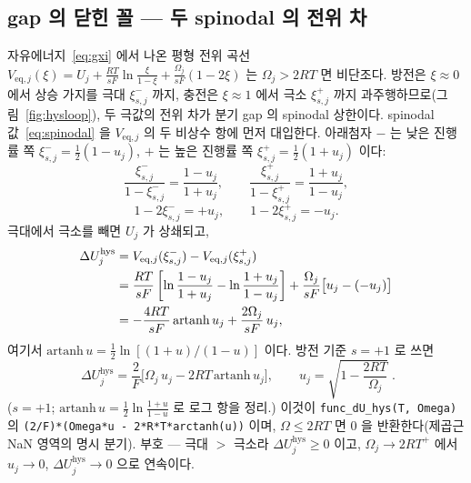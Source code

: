 \documentclass[11pt,a4paper]{article}
\newcommand{\eq}{\mathrm{eq}}
\newcommand{\hys}{\mathrm{hys}}
\newcommand{\code}[1]{\texttt{#1}}
\begin{document}
\subsection{gap 의 닫힌 꼴 — 두 spinodal 의 전위 차}
자유에너지~\eqref{eq:gxi} 에서 나온 평형 전위 곡선
$V_{\eq,j}(\xi)=U_j+\frac{RT}{sF}\ln\frac{\xi}{1-\xi}+\frac{\Omega_j}{sF}(1-2\xi)$ 는 $\Omega_j>2RT$ 면
비단조다. 방전은 $\xi\!\approx\!0$ 에서 상승 가지를 극대 $\xi_{s,j}^-$ 까지, 충전은 $\xi\!\approx\!1$ 에서 극소 $\xi_{s,j}^+$
까지 과주행하므로(그림~\ref{fig:hysloop}), 두 극값의 전위 차가 분기 gap 의 spinodal 상한이다.
spinodal 값~\eqref{eq:spinodal} 을 $V_{\eq,j}$ 의 두 비상수 항에 먼저 대입한다. 아래첨자 $-$ 는 낮은 진행률 쪽
$\xi_{s,j}^-=\tfrac12(1-u_j)$, $+$ 는 높은 진행률 쪽 $\xi_{s,j}^+=\tfrac12(1+u_j)$ 이다:
\begin{equation}
\frac{\xi_{s,j}^-}{1-\xi_{s,j}^-}=\frac{1-u_j}{1+u_j},\qquad
\frac{\xi_{s,j}^+}{1-\xi_{s,j}^+}=\frac{1+u_j}{1-u_j},
\label{eq:hyssub_log}
\end{equation}
\begin{equation}
1-2\xi_{s,j}^-=+u_j,\qquad
1-2\xi_{s,j}^+=-u_j.
\label{eq:hyssub_int}
\end{equation}
극대에서 극소를 빼면 $U_j$ 가 상쇄되고,
\begin{align}
\Delta U_j^\hys
&=V_{\eq,j}(\xi_{s,j}^-)-V_{\eq,j}(\xi_{s,j}^+)\notag\\
&=\frac{RT}{sF}\left[
\ln\frac{1-u_j}{1+u_j}
-\ln\frac{1+u_j}{1-u_j}\right]
+\frac{\Omega_j}{sF}\big[u_j-(-u_j)\big]\notag\\
&=-\frac{4RT}{sF}\,\mathrm{artanh}\,u_j
+\frac{2\Omega_j}{sF}\,u_j,
\label{eq:hysdiff_v809}
\end{align}
여기서 $\mathrm{artanh}\,u=\tfrac12\ln[(1+u)/(1-u)]$ 이다. 방전 기준 $s=+1$ 로 쓰면
\begin{equation}
\boxed{\;\Delta U_j^\hys
=\frac{2}{F}\Big[\Omega_j\,u_j-2RT\,\mathrm{artanh}\,u_j\Big],
\qquad u_j=\sqrt{1-\frac{2RT}{\Omega_j}}\;.}
\label{eq:dUhys}
\end{equation}
($s=+1$; $\mathrm{artanh}\,u=\tfrac12\ln\tfrac{1+u}{1-u}$ 로 로그 항을 정리.) 이것이 \code{func\_dU\_hys(T, Omega)} 의
\code{(2/F)*(Omega*u - 2*R*T*arctanh(u))} 이며, $\Omega\le2RT$ 면 $0$ 을 반환한다(제곱근 NaN 영역의 명시 분기).
부호 — 극대 $>$ 극소라 $\Delta U_j^\hys\ge0$ 이고, $\Omega_j\to2RT^+$ 에서 $u_j\to0$, $\Delta U_j^\hys\to0$ 으로
연속이다.
\end{document}
